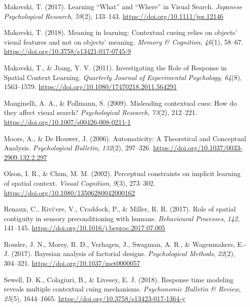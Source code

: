 \documentclass[
  man,floatsintext]{apa7}
\newlength{\cslhangindent}
\newlength{\cslentryspacingunit} %
\newenvironment{CSLReferences}[2] %
 {%
  \setlength{\parindent}{0pt}
  \ifodd #1
  \let\oldpar\par
  \def\par{\hangindent=\cslhangindent\oldpar}
  \fi
  \setlength{\parskip}{#2\cslentryspacingunit}
 }%
 {}
\begin{document}
\begin{CSLReferences}{1}{0}
\leavevmode{}%
Makovski, T. (2017). Learning {``{What}''} and {``{Where}''} in {Visual Search}. \emph{Japanese Psychological Research}, \emph{59}(2), 133--143. \url{https://doi.org/10.1111/jpr.12146}

\leavevmode{}%
Makovski, T. (2018). Meaning in learning: {Contextual} cueing relies on objects' visual features and not on objects' meaning. \emph{Memory \& Cognition}, \emph{46}(1), 58--67. \url{https://doi.org/10.3758/s13421-017-0745-9}

\leavevmode{}%
Makovski, T., \& Jiang, Y. V. (2011). Investigating the {Role} of {Response} in {Spatial Context Learning}. \emph{Quarterly Journal of Experimental Psychology}, \emph{64}(8), 1563--1579. \url{https://doi.org/10.1080/17470218.2011.564291}

\leavevmode{}%
Manginelli, A. A., \& Pollmann, S. (2009). Misleading contextual cues: {How} do they affect visual search? \emph{Psychological Research}, \emph{73}(2), 212--221. \url{https://doi.org/10.1007/s00426-008-0211-1}

\leavevmode{}%
Moors, A., \& De Houwer, J. (2006). Automaticity: {A Theoretical} and {Conceptual Analysis}. \emph{Psychological Bulletin}, \emph{132}(2), 297--326. \url{https://doi.org/10.1037/0033-2909.132.2.297}

\leavevmode{}%
Olson, I. R., \& Chun, M. M. (2002). Perceptual constraints on implicit learning of spatial context. \emph{Visual Cognition}, \emph{9}(3), 273--302. \url{https://doi.org/10.1080/13506280042000162}

\leavevmode{}%
Renaux, C., Rivi`ere, V., Craddock, P., \& Miller, R. R. (2017). Role of spatial contiguity in sensory preconditioning with humans. \emph{Behavioural Processes}, \emph{142}, 141--145. \url{https://doi.org/10.1016/j.beproc.2017.07.005}

\leavevmode{}%
Rouder, J. N., Morey, R. D., Verhagen, J., Swagman, A. R., \& Wagenmakers, E.-J. (2017). Bayesian analysis of factorial designs. \emph{Psychological Methods}, \emph{22}(2), 304--321. \url{https://doi.org/10.1037/met0000057}

\leavevmode{}%
Sewell, D. K., Colagiuri, B., \& Livesey, E. J. (2018). Response time modeling reveals multiple contextual cuing mechanisms. \emph{Psychonomic Bulletin \& Review}, \emph{25}(5), 1644--1665. \url{https://doi.org/10.3758/s13423-017-1364-y}


\end{CSLReferences}
\end{document}
